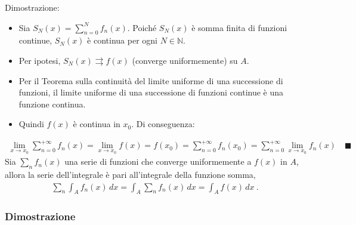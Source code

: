 \documentclass[letterpaper,10pt,italian]{jupyterBook}
\begin{document}
\sphinxAtStartPar
Dimostrazione:
\begin{itemize}
\item {} 
\sphinxAtStartPar
Sia \(S_N(x) = \sum_{n=0}^N f_n(x)\). Poiché \(S_N(x)\) è somma finita di funzioni continue, \(S_N(x)\) è continua per ogni \(N \in \mathbb{N}\).

\item {} 
\sphinxAtStartPar
Per ipotesi, \(S_N(x) \rightrightarrows f(x)\) (converge uniformemente) su \(A\).

\item {} 
\sphinxAtStartPar
Per il Teorema sulla continuità del limite uniforme di una successione di funzioni, il limite uniforme di una successione di funzioni continue è una funzione continua.

\item {} 
\sphinxAtStartPar
Quindi \(f(x)\) è continua in \(x_0\). Di conseguenza:

\end{itemize}
\begin{equation*}
\begin{split}\lim_{x \to x_0} \sum_{n=0}^{+\infty} f_n(x) = \lim_{x \to x_0} f(x) = f(x_0) = \sum_{n=0}^{+\infty} f_n(x_0) = \sum_{n=0}^{+\infty} \lim_{x \to x_0} f_n(x) \quad \blacksquare\end{split}
\end{equation*}
\sphinxAtStartPar
{} Sia \(\sum_n f_n(x)\) una serie di funzioni che converge uniformemente a \(f(x)\) in \(A\), allora la serie dell’integrale è pari all’integrale della funzione somma,
\begin{equation*}
\begin{split}\sum_n \int_{A} f_n(x) \, dx = \int_A \sum_n f_n(x) \, dx = \int_A f(x) \, dx \ .\end{split}
\end{equation*}\subsubsection*{Dimostrazione}
\end{document}
